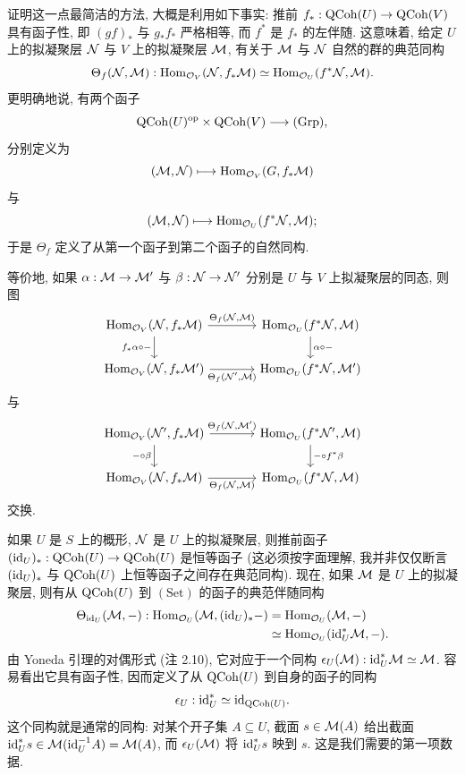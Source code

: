 证明这一点最简洁的方法, 大概是利用如下事实: 推前 $f_*:\operatorname{QCoh}(U)\to\operatorname{QCoh}(V)$ 具有函子性, 即 $(gf)_*$ 与 $g_*f_*$ 严格相等, 而 $f^*$ 是 $f_*$ 的左伴随. 这意味着, 给定 $U$ 上的拟凝聚层 $\mathcal N$ 与 $V$ 上的拟凝聚层 $\mathcal M$, 有关于 $\mathcal M$ 与 $\mathcal N$ 自然的群的典范同构
\[
\Theta_f(\mathcal N,\mathcal M):
\operatorname{Hom}_{\mathcal O_V}(\mathcal N,f_*\mathcal M)\simeq\operatorname{Hom}_{\mathcal O_U}(f^*\mathcal N,\mathcal M).
\]
更明确地说, 有两个函子
\[
\operatorname{QCoh}(U)^{\mathrm{op}}\times\operatorname{QCoh}(V)\longrightarrow(\mathrm{Grp}),
\]
分别定义为
\[
(\mathcal M,\mathcal N)\longmapsto\operatorname{Hom}_{\mathcal O_V}(G,f_*\mathcal M)
\]
与
\[
(\mathcal M,\mathcal N)\longmapsto\operatorname{Hom}_{\mathcal O_U}(f^*\mathcal N,\mathcal M);
\]
于是 $\Theta_f$ 定义了从第一个函子到第二个函子的自然同构.

等价地, 如果 $\alpha:\mathcal M\to\mathcal M'$ 与 $\beta:\mathcal N\to\mathcal N'$ 分别是 $U$ 与 $V$ 上拟凝聚层的同态, 则图
\[
\begin{tikzcd}[column sep=large]
\Hom_{\mathcal O_V}(\N,f_*\M)\arrow[r,"{\Theta_f(\N,\M)}"]\arrow[d,"{f_*\alpha\circ-}"']&\Hom_{\mathcal O_U}(f^*\N,\M)\arrow[d,"{\alpha\circ-}"]\\
\Hom_{\mathcal O_V}(\N,f_*\M')\arrow[r,"{\Theta_f(\N',\M)}"']&\Hom_{\mathcal O_U}(f^*\N,\M')
\end{tikzcd}
\]
与
\[
\begin{tikzcd}[column sep=large]
\Hom_{\mathcal O_V}(\N',f_*\M)\arrow[r,"{\Theta_f(\N,\M')}"]\arrow[d,"{-\circ\beta}"']&\Hom_{\mathcal O_U}(f^*\N',\M)\arrow[d,"{-\circ f^*\beta}"]\\
\Hom_{\mathcal O_V}(\N,f_*\M)\arrow[r,"{\Theta_f(\N,\M)}"']&\Hom_{\mathcal O_U}(f^*\N,\M)
\end{tikzcd}
\]
交换.

如果 $U$ 是 $S$ 上的概形, $\mathcal N$ 是 $U$ 上的拟凝聚层, 则推前函子 $(\mathrm{id}_U)_*:\operatorname{QCoh}(U)\to\operatorname{QCoh}(U)$ 是恒等函子 (这必须按字面理解, 我并非仅仅断言 $(\mathrm{id}_U)_*$ 与 $\operatorname{QCoh}(U)$ 上恒等函子之间存在典范同构). 现在, 如果 $\mathcal M$ 是 $U$ 上的拟凝聚层, 则有从 $\operatorname{QCoh}(U)$ 到 $(\mathrm{Set})$ 的函子的典范伴随同构
\[
\begin{aligned}
\Theta_{\mathrm{id}_U}(\mathcal M,-):
\operatorname{Hom}_{\mathcal O_U}(\mathcal M,(\mathrm{id}_U)_*-)
&=\operatorname{Hom}_{\mathcal O_U}(\mathcal M,-)\\
&\simeq\operatorname{Hom}_{\mathcal O_U}(\mathrm{id}_U^*\mathcal M,-).
\end{aligned}
\]
由 Yoneda 引理的对偶形式 (注 2.10), 它对应于一个同构 $\epsilon_U(\mathcal M):\mathrm{id}_U^*\mathcal M\simeq\mathcal M$. 容易看出它具有函子性, 因而定义了从 $\operatorname{QCoh}(U)$ 到自身的函子的同构
\[
\epsilon_U:\mathrm{id}_U^*\simeq\mathrm{id}_{\operatorname{QCoh}(U)}.
\]
这个同构就是通常的同构: 对某个开子集 $A\subseteq U$, 截面 $s\in\mathcal M(A)$ 给出截面 $\mathrm{id}_U^*s\in\mathcal M(\mathrm{id}_U^{-1}A)=\mathcal M(A)$, 而 $\epsilon_U(\mathcal M)$ 将 $\mathrm{id}_U^*s$ 映到 $s$. 这是我们需要的第一项数据.

